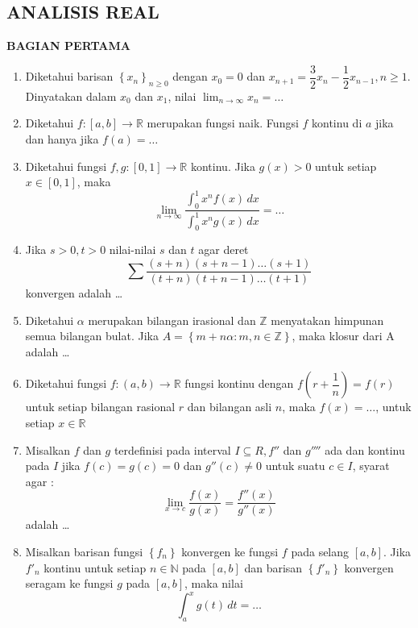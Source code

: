 \documentclass[12pt,twoside]{article}
\begin{document}
\subsection{ANALISIS REAL}
\textbf{BAGIAN PERTAMA}
\begin{enumerate}
	\item Diketahui barisan $\left\lbrace x_n \right\rbrace_{n \geq 0}$ dengan $x_0 = 0$ dan $x_{n+1} = \dfrac{3}{2}x_n - \dfrac{1}{2}x_{n-1}, n \geq 1.$ Dinyatakan dalam $x_0 $ dan $x_1$, nilai $\displaystyle\lim_{n \to \infty}x_n=\dots$

	\item Diketahui $f:[a,b] \to \mathbb{R}$ merupakan fungsi naik. Fungsi $f$ kontinu di $a$ jika dan hanya jika $f(a)=\dots$

	\item Diketahui fungsi $f,g : [0,1] \to \mathbb{R}$ kontinu. Jika $g(x)>0$ untuk setiap $x \in [0,1]$, maka
	      \begin{equation*}
		      \displaystyle\lim_{n \to \infty}\dfrac{\displaystyle\int_{0}^{1}x^n f(x)\,dx}{\displaystyle\int_{0}^{1} x^ng(x)\,dx} = \dots
	      \end{equation*}

	\item Jika $s>0, t>0$ nilai-nilai $s$ dan $t$ agar deret
	      \begin{equation*}
		      \displaystyle\sum \dfrac{(s+n)(s+n-1)\dots(s+1)}{(t+n)(t+n-1)\dots(t+1)}
	      \end{equation*}
	      konvergen adalah \dots

	\item Diketahui $\alpha$ merupakan bilangan irasional dan $\mathbb{Z}$ menyatakan himpunan semua bilangan bulat. Jika $A = \left\lbrace m + n\alpha : m,n \in \mathbb{Z} \right\rbrace$, maka klosur dari A adalah \dots

	\item Diketahui fungsi $f : (a,b) \to \mathbb{R}$ fungsi kontinu dengan $f\left(r+\dfrac{1}{n}\right) = f(r)$ untuk setiap bilangan rasional $r$ dan bilangan asli $n$, maka $f(x)=\dots$, untuk setiap $x \in \mathbb{R}$

	\item Misalkan $f$ dan $g$ terdefinisi pada interval $I \subseteq R, f'' $ dan $g''''$ ada dan kontinu pada $I $ jika $f(c)=g(c)=0$ dan $g''(c)\neq 0$ untuk suatu $c \in I$, syarat agar :
	      \begin{equation*}
		      \displaystyle\lim_{x \to c} \dfrac{f(x)}{g(x)} = \dfrac{f''(x)}{g''(x)}
	      \end{equation*}
	      adalah \dots

	\item Misalkan barisan fungsi $\left\lbrace f_n \right\rbrace$ konvergen ke fungsi $f$ pada selang $[a,b]$. Jika $f'_n$ kontinu untuk setiap $n \in \mathbb{N}$ pada $[a,b]$ dan barisan $\left\lbrace f'_n \right\rbrace$ konvergen seragam ke fungsi $g$ pada $[a,b]$, maka nilai
	      \begin{equation*}
		      \displaystyle\int_{a}^{x} g(t)\,dt = \dots
	      \end{equation*}
\end{enumerate}
\end{document}

